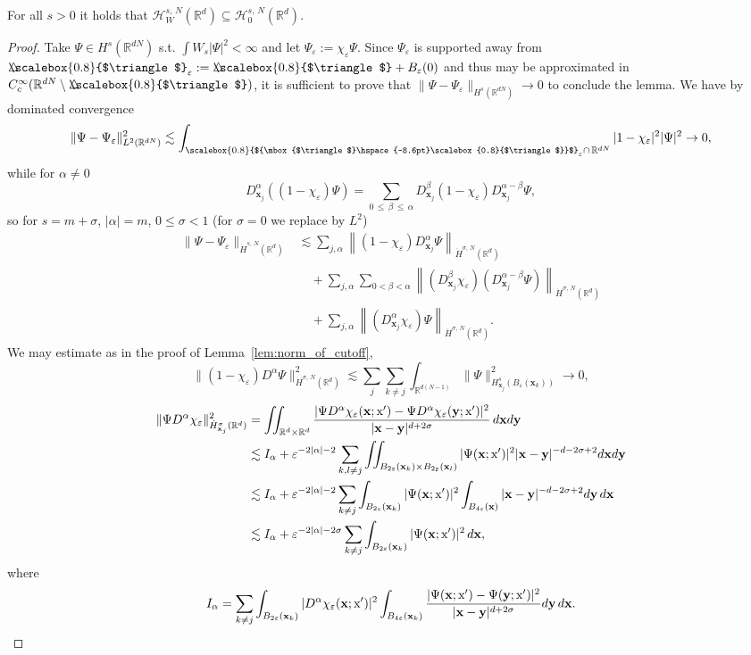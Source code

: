 \documentclass[AHL, Unicode, longabstracts, published]{cedram}
\newcommand*\eps{\varepsilon}
\newcommand*\R {\mathbb{R}}
\newcommand\1{{\ensuremath {\mathds 1} }}
\newcommand{\bx}{\mathbf{x}}
\newcommand{\by}{\mathbf{y}}
\newcommand{\cH}{\mathcal{H}}
\newcommand{\sx}{\textup{x}}
\newcommand{\bDelta}{{\mbox{$\triangle$}\hspace{-8.6pt}\scalebox{0.8}{$\triangle$}}}
\newcommand{\scriptbDelta}{\scalebox{0.8}{$\bDelta$}}
\begin{document}
\begin{lemm}\label{lem:inclusion_of_spaces_W}
For all $s > 0$ it holds that $\cH^{s,\,N}_W(\R^d) \subseteq \cH^{s,\,N}_0(\R^d)$.
\end{lemm}
\begin{proof}
Take $\Psi \in H^s(\R^{dN})$ s.t. $\int W_s|\Psi|^2 < \infty$ and let $\Psi_\eps := \chi_\eps\Psi$. Since $\Psi_\eps$ is supported away from $\bDelta_\eps := \bDelta + B_\eps(0)$ and thus may be approximated in $C_c^\infty(\R^{dN}\linebreak\setminus \bDelta)$, it is sufficient to prove that $\|\Psi-\Psi_\eps\|_{H^{s}(\R^{dN})} \to 0$ to conclude the lemma. We have by dominated convergence
\[
\|\Psi-\Psi_\eps\|_{L^2\left(\R^{dN}\right)}^2 \lesssim \int_{\scriptbDelta_\eps \cap \,\R^{dN}} |1-\chi_\eps|^2 |\Psi|^2 \to 0,
\]
while for $\alpha \neq 0$
\[
D^\alpha_{\bx_j}((1-\chi_\eps)\Psi) = \sum_{0\,\le\,\beta\,\le\,\alpha} D^\beta_{\bx_j}(1-\chi_\eps) D^{\alpha-\beta}_{\bx_j}\Psi,
\]
so for $s=m+\sigma$, $|\alpha| = m$, $0 \le \sigma < 1$ (for $\sigma=0$ we replace by $L^2$)
\begin{align*}
\|\Psi-\Psi_\eps\|_{\dot{H}^{s,\,N}(\R^d)} &\lesssim \sum_{j,\alpha} \left\|(1-\chi_\eps)D^\alpha_{\bx_j}\Psi\right\|_{\dot{H}^{\sigma,\,N}(\R^d)}\\
&\quad+ \sum_{j,\alpha} \sum_{0<\beta<\alpha} \left\|(D^\beta_{\bx_j} \chi_\eps) (D^{\alpha-\beta}_{\bx_j}\Psi)\right\|_{\dot{H}^{\sigma,\,N}(\R^d)} \\
&\quad+ \sum_{j,\alpha} \left\|(D^\alpha_{\bx_j} \chi_\eps) \Psi\right\|_{\dot{H}^{\sigma,\,N}(\R^d)}.
\end{align*}
We may estimate as in the proof of Lemma~\ref{lem:norm_of_cutoff},
\[
\|(1-\chi_\eps)D^\alpha\Psi\|_{\dot{H}^{\sigma,\,N}(\R^d)}^2
\lesssim \sum_j\sum_{k\neq j} \int_{\R^{d(N-1)}} \|\Psi\|_{H^{s}_{\bx_j}(B_\eps(\bx_k))}^2
\to 0,
\]
\begin{align*}
\|\Psi D^\alpha \chi_\eps\|_{\dot{H}^\sigma_{\bx_j}(\R^d)}^2 &= \iint_{\R^d \times \R^d} \dfrac{|\Psi D^\alpha\chi_\eps(\bx;\sx') - \Psi D^\alpha\chi_\eps(\by;\sx')|^2}{|\bx-\by|^{d+2\sigma}} \,d\bx d\by \\
&\lesssim I_\alpha + \eps^{-2|\alpha|-2} \sum_{k,l \neq j} \iint_{B_{2\eps}(\bx_k) \times B_{2\eps}(\bx_l)} |\Psi(\bx;\sx')|^2|\bx - \by|^{-d-2\sigma+2} d\bx d\by \\
&\lesssim I_\alpha + \eps^{-2|\alpha|-2} \sum_{k \neq j} \int_{B_{2\eps}(\bx_k)} |\Psi(\bx;\sx')|^2 \int_{B_{4\eps}(\bx)} |\bx - \by|^{-d-2\sigma+2} d\by \,d\bx \\
&\lesssim I_\alpha + \eps^{-2|\alpha| - 2\sigma} \sum_{k \neq j}
\int_{B_{2\eps}(\bx_k)} |\Psi(\bx;\sx')|^2 \,d\bx,
\end{align*}
where
\begin{equation*}
I_\alpha = \sum_{k \neq j} \int_{B_{2\eps}(\bx_k)} |D^\alpha\chi_\eps(\bx;\sx')|^2 \int_{B_{4\eps}(\bx_k)} \dfrac{|\Psi(\bx;\sx') - \Psi(\by;\sx')|^2}{|\bx-\by|^{d+2\sigma}} d\by \,d\bx.
\end{equation*}


\end{proof}
\end{document}
